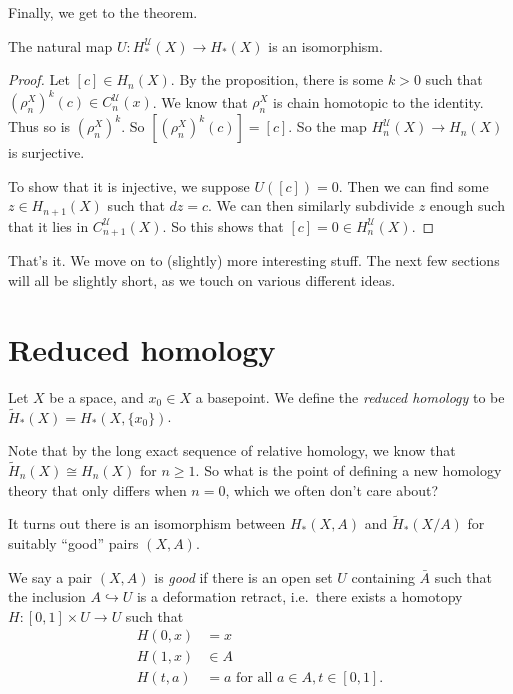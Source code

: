 \documentclass[a4paper]{article}
\theoremstyle{definition}
\begin{document}
Finally, we get to the theorem.
\begin{thm}
  The natural map $U: H_*^\mathcal{U}(X) \to H_*(X)$ is an isomorphism.
\end{thm}

\begin{proof}
  Let $[c] \in H_n(X)$. By the proposition, there is some $k > 0$ such that $(\rho_n^X)^k (c) \in C_n^{\mathcal{U}}(x)$. We know that $\rho_n^X$ is chain homotopic to the identity. Thus so is $(\rho_n^X)^k$. So $[(\rho_n^X)^k (c)] = [c]$. So the map $H_n^\mathcal{U}(X) \to H_n(X)$ is surjective.

  To show that it is injective, we suppose $U([c]) = 0$. Then we can find some $z \in H_{n + 1}(X)$ such that $dz = c$. We can then similarly subdivide $z$ enough such that it lies in $C^\mathcal{U}_{n + 1}(X)$. So this shows that $[c] = 0 \in H_n^{\mathcal{U}}(X)$.
\end{proof}

That's it. We move on to (slightly) more interesting stuff. The next few sections will all be slightly short, as we touch on various different ideas.

\section{Reduced homology}

\begin{defi}
  Let $X$ be a space, and $x_0 \in X$ a basepoint. We define the \emph{reduced homology} to be $\tilde{H}_*(X) = H_*(X, \{x_0\})$.
\end{defi}
Note that by the long exact sequence of relative homology, we know that $\tilde{H}_n(X) \cong H_n(X)$ for $n \geq 1$. So what is the point of defining a new homology theory that only differs when $n = 0$, which we often don't care about?

It turns out there is an isomorphism between $H_*(X, A)$ and $\tilde{H}_*(X/A)$ for suitably ``good'' pairs $(X, A)$.

\begin{defi}
  We say a pair $(X, A)$ is \emph{good} if there is an open set $U$ containing $\bar{A}$ such that the inclusion $A \hookrightarrow U$ is a deformation retract, i.e.\ there exists a homotopy $H: [0, 1] \times U \to U$ such that
  \begin{align*}
    H(0, x) &= x\\
    H(1, x) &\in A\\
    H(t, a) &= a\text{ for all $a \in A, t \in [0, 1]$}.
  \end{align*}
\end{defi}
\end{document}
